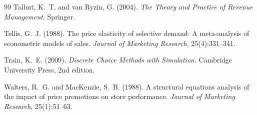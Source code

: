 \documentclass[11pt,a4paper]{article}
\begin{document}
\begin{thebibliography}{99}
Talluri, K.~T. and van Ryzin, G. (2004).
\newblock \emph{The Theory and Practice of Revenue Management}.
\newblock Springer.

Tellis, G.~J. (1988).
\newblock The price elasticity of selective demand: A meta-analysis of econometric models of sales.
\newblock \emph{Journal of Marketing Research}, 25(4):331--341.

Train, K.~E. (2009).
\newblock \emph{Discrete Choice Methods with Simulation}.
\newblock Cambridge University Press, 2nd edition.

Walters, R.~G. and MacKenzie, S.~B. (1988).
\newblock A structural equations analysis of the impact of price promotions on store performance.
\newblock \emph{Journal of Marketing Research}, 25(1):51--63.

\end{thebibliography}
\end{document}
